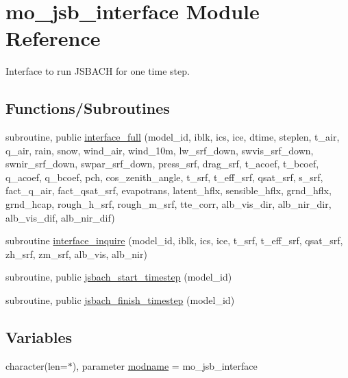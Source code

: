 \hypertarget{namespacemo__jsb__interface}{}\section{mo\+\_\+jsb\+\_\+interface Module Reference}
\label{namespacemo__jsb__interface}


Interface to run J\+S\+B\+A\+C\+H for one time step.  


\subsection*{Functions/\+Subroutines}
\begin{DoxyCompactItemize}
\item 
subroutine, public \hyperlink{namespacemo__jsb__interface_a669b978bf786a78426b4aa57d8c8f7b1}{interface\+\_\+full} (model\+\_\+id, iblk, ics, ice, dtime, steplen, t\+\_\+air, q\+\_\+air, rain, snow, wind\+\_\+air, wind\+\_\+10m, lw\+\_\+srf\+\_\+down, swvis\+\_\+srf\+\_\+down, swnir\+\_\+srf\+\_\+down, swpar\+\_\+srf\+\_\+down, press\+\_\+srf, drag\+\_\+srf, t\+\_\+acoef, t\+\_\+bcoef, q\+\_\+acoef, q\+\_\+bcoef, pch, cos\+\_\+zenith\+\_\+angle, t\+\_\+srf, t\+\_\+eff\+\_\+srf, qsat\+\_\+srf, s\+\_\+srf, fact\+\_\+q\+\_\+air, fact\+\_\+qsat\+\_\+srf, evapotrans, latent\+\_\+hflx, sensible\+\_\+hflx, grnd\+\_\+hflx, grnd\+\_\+hcap, rough\+\_\+h\+\_\+srf, rough\+\_\+m\+\_\+srf, tte\+\_\+corr, alb\+\_\+vis\+\_\+dir, alb\+\_\+nir\+\_\+dir, alb\+\_\+vis\+\_\+dif, alb\+\_\+nir\+\_\+dif)
\item 
subroutine \hyperlink{namespacemo__jsb__interface_a250055ad69ba018faf24c0ddf07a8f11}{interface\+\_\+inquire} (model\+\_\+id, iblk, ics, ice, t\+\_\+srf, t\+\_\+eff\+\_\+srf, qsat\+\_\+srf, zh\+\_\+srf, zm\+\_\+srf, alb\+\_\+vis, alb\+\_\+nir)
\item 
subroutine, public \hyperlink{namespacemo__jsb__interface_adc4527f7e9aae89da0fc1b77a7df3bb8}{jsbach\+\_\+start\+\_\+timestep} (model\+\_\+id)
\item 
subroutine, public \hyperlink{namespacemo__jsb__interface_a95c35cbcc6ae136bb45b71fa2a944bf5}{jsbach\+\_\+finish\+\_\+timestep} (model\+\_\+id)
\end{DoxyCompactItemize}
\subsection*{Variables}
\begin{DoxyCompactItemize}
\item 
character(len=$\ast$), parameter \hyperlink{namespacemo__jsb__interface_a4b120a12931c3fa9318b7a3421f3e919}{modname} = \textquotesingle{}mo\+\_\+jsb\+\_\+interface\textquotesingle{}
\end{DoxyCompactItemize}


